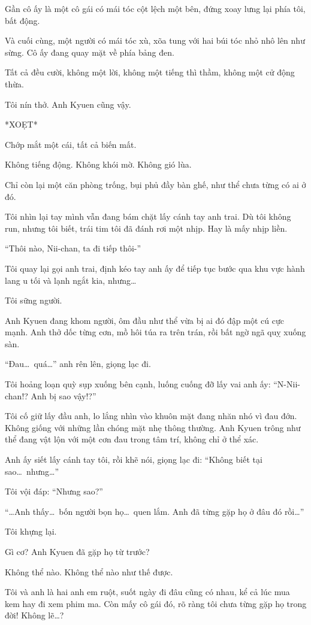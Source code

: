\documentclass[../main.tex]{subfiles}
\begin{document}
Gần cô ấy là một cô gái có mái tóc cột lệch một bên, đứng xoay lưng lại phía tôi, bất động.

Và cuối cùng, một người có mái tóc xù, xõa tung với hai búi tóc nhỏ nhô lên như sừng. Cô ấy đang quay mặt về phía bảng đen.

Tất cả đều cười, không một lời, không một tiếng thì thầm, không một cử động thừa.

Tôi nín thở. Anh Kyuen cũng vậy.

*XOẸT*

Chớp mắt một cái, tất cả biến mất.

Không tiếng động. Không khói mờ. Không gió lùa.

Chỉ còn lại một căn phòng trống, bụi phủ đầy bàn ghế, như thể chưa từng có ai ở đó.

Tôi nhìn lại tay mình vẫn đang bám chặt lấy cánh tay anh trai. Dù tôi không run, nhưng tôi biết, trái tim tôi đã đánh rơi một nhịp. Hay là mấy nhịp liền.

``Thôi nào, Nii-chan, ta đi tiếp thôi-''

Tôi quay lại gọi anh trai, định kéo tay anh ấy để tiếp tục bước qua khu vực hành lang u tối và lạnh ngắt kia, nhưng\dots

Tôi sững người.

Anh Kyuen đang khom người, ôm đầu như thể vừa bị ai đó đập một cú cực mạnh. Anh thở dốc từng cơn, mồ hôi túa ra trên trán, rồi bất ngờ ngã quỵ xuống sàn.

``Đau\dots\ quá\dots'' anh rên lên, giọng lạc đi.

Tôi hoảng loạn quỳ sụp xuống bên cạnh, luống cuống đỡ lấy vai anh ấy: ``N-Nii-chan!? Anh bị sao vậy!?''

Tôi cố giữ lấy đầu anh, lo lắng nhìn vào khuôn mặt đang nhăn nhó vì đau đớn. Không giống với những lần chóng mặt nhẹ thông thường. Anh Kyuen trông như thể đang vật lộn với một cơn đau trong tâm trí, không chỉ ở thể xác.

Anh ấy siết lấy cánh tay tôi, rồi khẽ nói, giọng lạc đi: ``Không biết tại sao\dots\ nhưng\dots''

Tôi vội đáp: ``Nhưng sao?''

``\dots Anh thấy\dots\ bốn người bọn họ\dots\ quen lắm. Anh đã từng gặp họ ở đâu đó rồi\dots''

Tôi khựng lại.

Gì cơ? Anh Kyuen đã gặp họ từ trước?

Không thể nào. Không thể nào như thế được.

Tôi và anh là hai anh em ruột, suốt ngày đi đâu cũng có nhau, kể cả lúc mua kem hay đi xem phim ma. Còn mấy cô gái đó, rõ ràng tôi chưa từng gặp họ trong đời! Không lẽ\dots?
\end{document}
